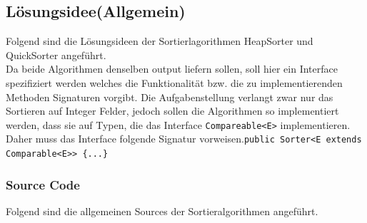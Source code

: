 \documentclass[11pt, a4paper, twoside]{article}   	%
\newcommand{\srcDir}{../src/main/java}
\newcommand{\mainPackage}{\srcDir/at/fhooe/swe4/lab3}
\newcommand{\ideaSection}{Lösungsidee}
\newcommand{\inlinecode}{\lstinline[style=inlineSource]}
\begin{document}
\subsection{\ideaSection \hspace{2mm}(Allgemein)}
Folgend sind die Lösungsideen der Sortierlagorithmen HeapSorter und QuickSorter angeführt.\\
Da beide Algorithmen denselben output liefern sollen, soll hier ein Interface spezifiziert werden welches die Funktionalität bzw. die zu implementierenden Methoden Signaturen vorgibt. Die Aufgabenstellung verlangt zwar nur das Sortieren auf Integer Felder, jedoch sollen die Algorithmen so implementiert werden, dass sie auf Typen, die das Interface \inlinecode{Compareable<E>} implementieren. Daher muss das Interface folgende Signatur vorweisen.\inlinecode|public Sorter<E extends Comparable<E>> {...}|
\newpage
\subsubsection{Source Code\hspace{2mm}{Allgemein}}
Folgend sind die allgemeinen Sources der Sortieralgorithmen angeführt.

\newpage
\end{document}
